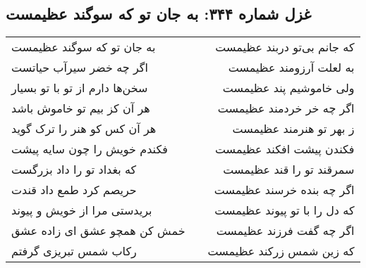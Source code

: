 \begin{center}
\section*{غزل شماره ۳۴۴: به جان تو که سوگند عظیمست}
\label{sec:0344}
\begin{longtable}{l p{0.5cm} r}
به جان تو که سوگند عظیمست
&&
که جانم بی‌تو دربند عظیمست
\\
اگر چه خضر سیرآب حیاتست
&&
به لعلت آرزومند عظیمست
\\
سخن‌ها دارم از تو با تو بسیار
&&
ولی خاموشیم پند عظیمست
\\
هر آن کز بیم تو خاموش باشد
&&
اگر چه خر خردمند عظیمست
\\
هر آن کس کو هنر را ترک گوید
&&
ز بهر تو هنرمند عظیمست
\\
فکندم خویش را چون سایه پیشت
&&
فکندن پیشت افکند عظیمست
\\
که بغداد تو را داد بزرگست
&&
سمرقند تو را قند عظیمست
\\
حریصم کرد طمع داد قندت
&&
اگر چه بنده خرسند عظیمست
\\
بریدستی مرا از خویش و پیوند
&&
که دل را با تو پیوند عظیمست
\\
خمش کن همچو عشق ای زاده عشق
&&
اگر چه گفت فرزند عظیمست
\\
رکاب شمس تبریزی گرفتم
&&
که زین شمس زرکند عظیمست
\\
\end{longtable}
\end{center}
